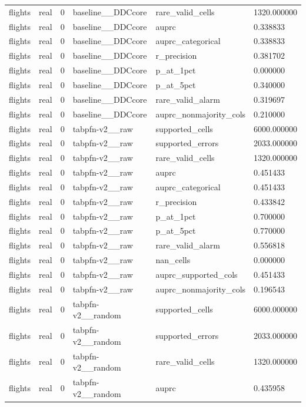\begin{tabular}{llllll}
flights & real & 0 & baseline\_\_DDCcore & rare\_valid\_cells & 1320.000000 \\
flights & real & 0 & baseline\_\_DDCcore & auprc & 0.338833 \\
flights & real & 0 & baseline\_\_DDCcore & auprc\_categorical & 0.338833 \\
flights & real & 0 & baseline\_\_DDCcore & r\_precision & 0.381702 \\
flights & real & 0 & baseline\_\_DDCcore & p\_at\_1pct & 0.000000 \\
flights & real & 0 & baseline\_\_DDCcore & p\_at\_5pct & 0.340000 \\
flights & real & 0 & baseline\_\_DDCcore & rare\_valid\_alarm & 0.319697 \\
flights & real & 0 & baseline\_\_DDCcore & auprc\_nonmajority\_cols & 0.210000 \\
flights & real & 0 & tabpfn-v2\_\_raw & supported\_cells & 6000.000000 \\
flights & real & 0 & tabpfn-v2\_\_raw & supported\_errors & 2033.000000 \\
flights & real & 0 & tabpfn-v2\_\_raw & rare\_valid\_cells & 1320.000000 \\
flights & real & 0 & tabpfn-v2\_\_raw & auprc & 0.451433 \\
flights & real & 0 & tabpfn-v2\_\_raw & auprc\_categorical & 0.451433 \\
flights & real & 0 & tabpfn-v2\_\_raw & r\_precision & 0.433842 \\
flights & real & 0 & tabpfn-v2\_\_raw & p\_at\_1pct & 0.700000 \\
flights & real & 0 & tabpfn-v2\_\_raw & p\_at\_5pct & 0.770000 \\
flights & real & 0 & tabpfn-v2\_\_raw & rare\_valid\_alarm & 0.556818 \\
flights & real & 0 & tabpfn-v2\_\_raw & nan\_cells & 0.000000 \\
flights & real & 0 & tabpfn-v2\_\_raw & auprc\_supported\_cols & 0.451433 \\
flights & real & 0 & tabpfn-v2\_\_raw & auprc\_nonmajority\_cols & 0.196543 \\
flights & real & 0 & tabpfn-v2\_\_random & supported\_cells & 6000.000000 \\
flights & real & 0 & tabpfn-v2\_\_random & supported\_errors & 2033.000000 \\
flights & real & 0 & tabpfn-v2\_\_random & rare\_valid\_cells & 1320.000000 \\
flights & real & 0 & tabpfn-v2\_\_random & auprc & 0.435958 \\

\end{tabular}
